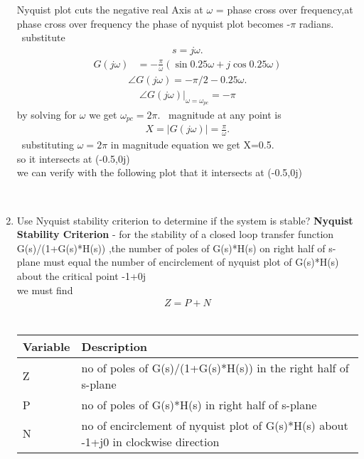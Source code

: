 \begin{enumerate}[label=\thesection.\arabic*.,ref=\thesection.\theenumi]
 Nyquist plot cuts the negative real
Axis at $\omega$ = phase cross over frequency,at phase cross over frequency the phase of nyquist plot becomes -$\pi$ radians.
\
\newline substitute \begin{align}
s=j\omega.\end{align} 
\begin{align}
G(j\omega)&= -\frac{\pi}{\omega}(\sin{0.25\omega}+j\cos{0.25\omega})
\end{align}
\begin{align}
\angle G(j\omega)=-\pi/2 -0.25\omega.
\end{align}
\begin{align}
\angle G(j\omega)|_{\omega=\omega_{pc}}=-\pi
\end{align}
by solving for $\omega$ we get $\omega_{pc}=2\pi$.
\
\newline magnitude at any point is\begin{align}
X=|G(j\omega)|=\frac{\pi}{\omega}.    
\end{align} 
\
\newline substituting $\omega=2\pi$ in magnitude equation we get X=0.5.
\\
\newline so it intersects at (-0.5,0j)
\\
\newline we can verify with the following plot that it intersects at (-0.5,0j)

\\
\item Use Nyquist stability criterion to determine if the system is stable?
\newline
\solution
 \textbf{Nyquist Stability Criterion} - for  the stability of a closed loop transfer function G(s)/(1+G(s)*H(s)) ,the number of poles of G(s)*H(s) on right half of s-plane must equal the number of encirclement of nyquist plot of  G(s)*H(s) about the critical point -1+0j
\\
\newline we must find
\begin{align}
Z=P+N    
\end{align}
\
\begin{tabular}{ |p{4cm}||p{4cm}|  }
 \hline
 
 \hline
 Variable&Description\\
 \hline
 Z&no of poles of G(s)/(1+G(s)*H(s)) in the right half of s-plane\\
 \hline
 P&no of poles of G(s)*H(s) in right half of s-plane \\
 \hline
 N&no of encirclement of nyquist plot of G(s)*H(s) about -1+j0 in clockwise direction\\
 

\end{tabular}
\end{enumerate}
